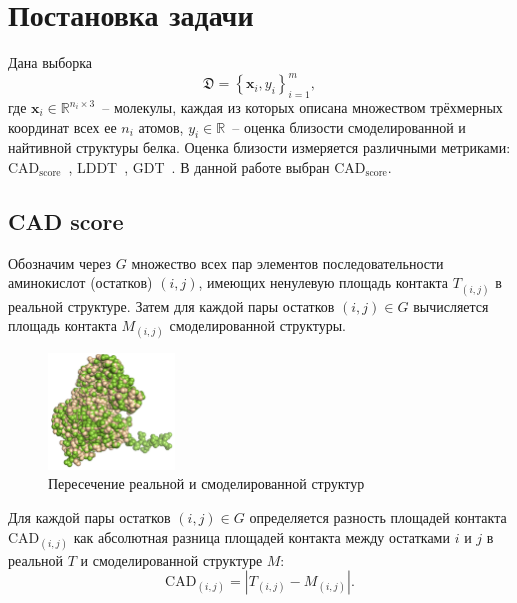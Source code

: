 \documentclass[14pt]{extarticle}
\begin{document}
\section{Постановка задачи}

Дана выборка $$\mathfrak{D} = \left\{\mathbf{x}_i, {y}_i\right\}_{i=1}^m,$$ где $\mathbf{x}_i\in \mathbb{R}^{n_i\times 3}$~-- молекулы, каждая из которых описана множеством трёхмерных координат всех ее $n_i$ атомов, ${y}_i \in \mathbb{R}$~-- оценка близости смоделированной и найтивной структуры белка. Оценка близости измеряется различными метриками: $\text{CAD}_\text{score}$~\cite{Olechnovic2013CADscoreAN}, LDDT~\cite{Mariani2013lDDTAL}, GDT~\cite{GDT}. В данной работе выбран $\text{CAD}_\text{score}$. 

\subsection{CAD score}

Обозначим через $G$ множество всех пар элементов последовательности аминокислот (остатков)  $(i, j)$, имеющих ненулевую площадь контакта $T_{(i, j)}$ в реальной структуре. Затем для каждой пары остатков $(i, j)\in G$ вычисляется площадь контакта $M_{(i, j)}$ смоделированной структуры. 

\begin{figure}[h]
	\centering
	\includegraphics[width=0.3\textwidth]{T0861_Atome2_CBS_TS4.pdf}
	\caption{Пересечение реальной и смоделированной структур}
	\label{CAD_example}
\end{figure}

Для каждой пары остатков $(i, j) \in G$ определяется разность площадей контакта $\mathrm{CAD}_{(i, j)}$ как абсолютная разница площадей контакта между остатками $i$ и $j$ в реальной $T$ и смоделированной структуре $M$:
$$\mathrm{CAD}_{(i, j)}=\left|T_{(i, j)}-M_{(i, j)}\right|.$$
\end{document}
